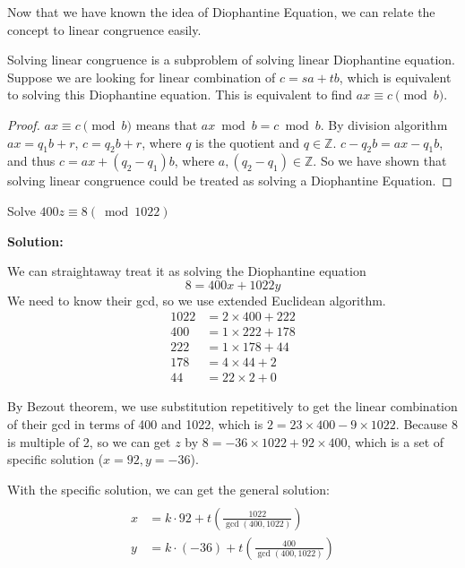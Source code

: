 Now that we have known the idea of Diophantine Equation, we can relate the concept to linear
congruence easily. 
\begin{proposition}
    Solving linear congruence is a subproblem of solving linear Diophantine equation.
    Suppose we are looking for linear combination of $c=sa+tb$, which is equivalent
to solving this Diophantine equation. This is equivalent to find $ax\equiv c \pmod b$.
\end{proposition}
\begin{proof}
    $ax\equiv c \pmod b$ means that $ax \bmod b = c \bmod b$. By division algorithm
    $ax = q_1b + r$, $c = q_2b + r$, where $q$ is the quotient and $q\in \mathbb{Z}$. 
    $c-q_2b = ax-q_1b$, and thus $c = ax + (q_2-q_1)b$, where $a, (q_2-q_1)\in \mathbb{Z}$.
    So we have shown that solving linear congruence could be treated as solving a Diophantine Equation.
\end{proof}
\begin{example}
    Solve $400z\equiv 8 (\bmod1022)$
\end{example}
\textbf{Solution:} 

    We can straightaway treat it as solving the Diophantine equation
    $$8 = 400x + 1022y$$
    We need to know their gcd, so we use extended Euclidean algorithm.
   $$ \begin{aligned}
        1022&=2\times400+222\\
        400&=1\times 222+178\\
        222&=1\times 178+44\\
        178&=4\times 44+2\\
        44&=22\times2+0
        \end{aligned}$$
    
        By Bezout theorem, we use substitution repetitively to get the linear combination of
        their gcd in terms of 400 and 1022, which is $2 = 23\times 400 -9\times 1022$.
        Because 8 is multiple of 2, so we can get $z$ by $8 = -36\times 1022 + 92\times 400$, 
        which is a set of specific solution ($x = 92, y=-36$).

        With the specific solution, we can get the general solution:
        $$ \begin{aligned}\\
            x&=k\cdot 92+t(\frac{1022}{\gcd(400,1022)})\\
            y&=k\cdot(-36)+t(\frac{400}{\gcd(400,1022)} )
            \end{aligned}$$
        

